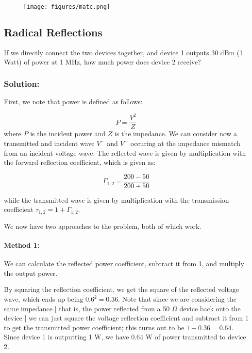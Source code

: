 \documentclass{article}
\begin{document}
\begin{figure}[H]
\begin{center}
    \texttt{[image: figures/matc.png]}
\end{center}
\end{figure}
\subsection{Radical Reflections}
If we directly connect the two devices together, and device 1 outputs 30 dBm (1 Watt) of power at 1 MHz, how much power does device 2 receive?

\subsubsection{Solution:} 

First, we note that power is defined as follows:

\[
P = \frac{V^2}{Z}
\]
where $P$ is the incident power and $Z$ is the impedance. We can consider now a transmitted and incident wave $V^-$ and $V^+$ occuring at the impedance mismatch from an incident voltage wave. The reflected wave is given by multiplication with the forward reflection coefficient, which is given as:

\[
\Gamma_{1,2} = \frac{200 - 50}{200 + 50}
\]

while the transmitted wave is given by multiplication with the transmission coefficient $\tau_{1,2} = 1 + \Gamma_{1,2}$. 

\vspace{3mm}

We now have two approaches to the problem, both of which work. 

\paragraph{Method 1:} We can calculate the reflected power coefficient, subtract it from 1, and multiply the output power. 
\vspace{3mm}

By squaring the reflection coefficient, we get the square of the reflected voltage wave, which ends up being $0.6^2 = 0.36$. Note that since we are considering the same impedance | that is, the power reflected from a 50 $\Omega$ device back onto the device | we can just square the voltage reflection coefficient and subtract it from 1 to get the transmitted power coefficient; this turns out to be $1 - 0.36 = 0.64$. Since device 1 is outputting 1 W, we have 0.64 W of power transmitted to device 2. 
\end{document}
